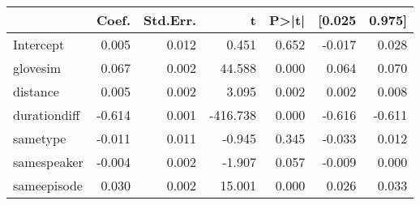 \begin{tabular}{lrrrrrr}
\toprule
{} &  Coef. &  Std.Err. &        t &  P>|t| &  [0.025 &  0.975] \\
\midrule
Intercept    &  0.005 &     0.012 &    0.451 &  0.652 &  -0.017 &   0.028 \\
glovesim     &  0.067 &     0.002 &   44.588 &  0.000 &   0.064 &   0.070 \\
distance     &  0.005 &     0.002 &    3.095 &  0.002 &   0.002 &   0.008 \\
durationdiff & -0.614 &     0.001 & -416.738 &  0.000 &  -0.616 &  -0.611 \\
sametype     & -0.011 &     0.011 &   -0.945 &  0.345 &  -0.033 &   0.012 \\
samespeaker  & -0.004 &     0.002 &   -1.907 &  0.057 &  -0.009 &   0.000 \\
sameepisode  &  0.030 &     0.002 &   15.001 &  0.000 &   0.026 &   0.033 \\
\bottomrule
\end{tabular}

